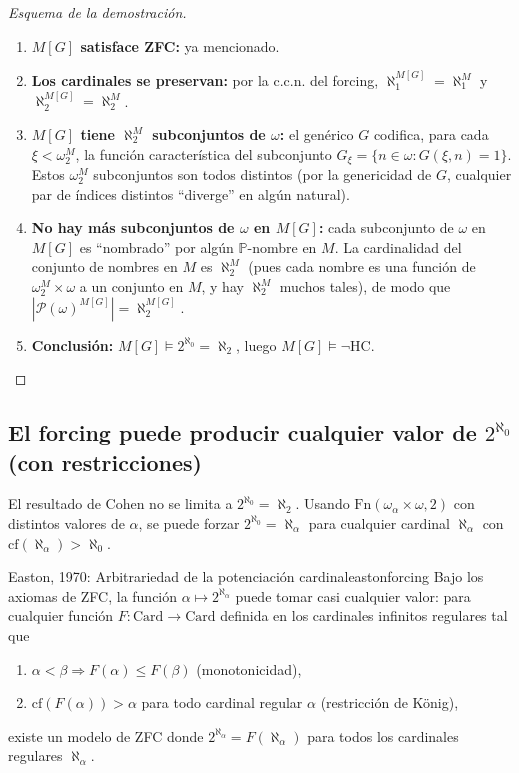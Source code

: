\begin{proof}[Esquema de la demostración]
\begin{enumerate}[leftmargin=2em, label=(\roman*)]
  \item \textbf{$M[G]$ satisface ZFC:} ya mencionado.
  \item \textbf{Los cardinales se preservan:} por la c.c.n. del forcing, $\aleph_1^{M[G]} = \aleph_1^M$ y $\aleph_2^{M[G]} = \aleph_2^M$.
  \item \textbf{$M[G]$ tiene $\aleph_2^M$ subconjuntos de $\omega$:} el genérico $G$ codifica, para cada $\xi < \omega_2^M$, la función característica del subconjunto $G_\xi = \{n \in \omega : G(\xi, n) = 1\}$. Estos $\omega_2^M$ subconjuntos son todos distintos (por la genericidad de $G$, cualquier par de índices distintos ``diverge'' en algún natural).
  \item \textbf{No hay más subconjuntos de $\omega$ en $M[G]$:} cada subconjunto de $\omega$ en $M[G]$ es ``nombrado'' por algún $\mathbb{P}$-nombre en $M$. La cardinalidad del conjunto de nombres en $M$ es $\aleph_2^M$ (pues cada nombre es una función de $\omega_2^M \times \omega$ a un conjunto en $M$, y hay $\aleph_2^M$ muchos tales), de modo que $|\mathcal{P}(\omega)^{M[G]}| = \aleph_2^{M[G]}$.
  \item \textbf{Conclusión:} $M[G] \models 2^{\aleph_0} = \aleph_2$, luego $M[G] \models \neg\mathrm{HC}$.
\end{enumerate}
\end{proof}

\subsection{El forcing puede producir cualquier valor de \texorpdfstring{$2^{\aleph_0}$}{el continuo} (con restricciones)}

El resultado de Cohen no se limita a $2^{\aleph_0} = \aleph_2$. Usando $\mathrm{Fn}(\omega_\alpha \times \omega, 2)$ con distintos valores de $\alpha$, se puede forzar $2^{\aleph_0} = \aleph_\alpha$ para cualquier cardinal $\aleph_\alpha$ con $\mathrm{cf}(\aleph_\alpha) > \aleph_0$.

\begin{teorema}{Easton, 1970: Arbitrariedad de la potenciación cardinal}{eastonforcing}
Bajo los axiomas de ZFC, la función $\alpha \mapsto 2^{\aleph_\alpha}$ puede tomar casi cualquier valor: para cualquier función $F : \mathrm{Card} \to \mathrm{Card}$ definida en los cardinales infinitos regulares tal que
\begin{enumerate}[leftmargin=2em, label=(\roman*)]
  \item $\alpha < \beta \Rightarrow F(\alpha) \leq F(\beta)$ (monotonicidad),
  \item $\mathrm{cf}(F(\alpha)) > \alpha$ para todo cardinal regular $\alpha$ (restricción de König),
\end{enumerate}
existe un modelo de ZFC donde $2^{\aleph_\alpha} = F(\aleph_\alpha)$ para todos los cardinales regulares $\aleph_\alpha$.
\end{teorema}

